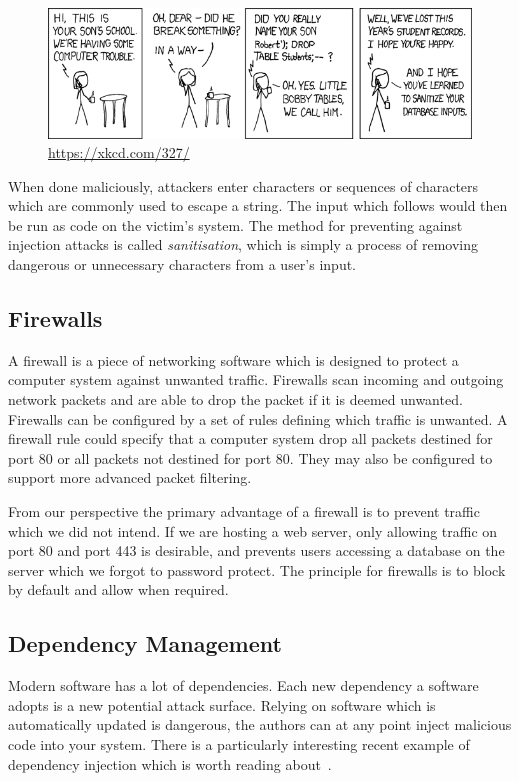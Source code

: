 \begin{figure}[ht]
\begin{center}
\includegraphics[width=\textwidth]{bobbytables.png}
\end{center}
\vspace{-3mm}
\caption{\url{https://xkcd.com/327/}}
\end{figure}

When done maliciously, attackers enter characters or sequences of characters which are commonly used to escape a string.
The input which follows would then be run as code on the victim's system.
The method for preventing against injection attacks is called \textsl{sanitisation},
which is simply a process of removing dangerous or unnecessary characters from a user's input.

\subsection{Firewalls}
A firewall is a piece of networking software which is designed to protect a computer system against unwanted traffic.
Firewalls scan incoming and outgoing network packets and are able to drop the packet if it is deemed unwanted.
Firewalls can be configured by a set of rules defining which traffic is unwanted.
A firewall rule could specify that a computer system drop all packets destined for port 80 or all packets not destined for port 80.
They may also be configured to support more advanced packet filtering.

From our perspective the primary advantage of a firewall is to prevent traffic which we did not intend.
If we are hosting a web server, only allowing traffic on port 80 and port 443 is desirable,
and prevents users accessing a database on the server which we forgot to password protect.
The principle for firewalls is to block by default and allow when required.

\subsection{Dependency Management}
Modern software has a lot of dependencies.
Each new dependency a software adopts is a new potential attack surface.
Relying on software which is automatically updated is dangerous,
the authors can at any point inject malicious code into your system.
There is a particularly interesting recent example of dependency injection which is worth reading about~\cite{color-js}.

